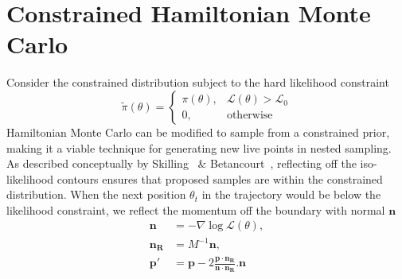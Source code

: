 \documentclass[11pt]{article}
\begin{document}
\section{Constrained Hamiltonian Monte Carlo}\label{sec:chmc}
    Consider the constrained distribution subject to the hard likelihood constraint
    \begin{equation}\label{eq:constrained_prior}
        \tilde{\pi}(\theta) = \begin{cases}
                                  \pi(\theta), & \mathcal{L}(\theta) > \mathcal{L}_0 \\
                                  0, & \text{otherwise}
                              \end{cases}
    \end{equation}
    Hamiltonian Monte Carlo can be modified to sample from a constrained prior, making it a viable
    technique for generating new live points in nested sampling.
    As described conceptually by Skilling~\cite{GMC} \& Betancourt~\cite{Betancourt_NS_CHMC}, reflecting
    off the iso-likelihood contours ensures that proposed samples are within the constrained distribution.
    When the next position $\theta_t$ in the trajectory would be below the likelihood constraint, we reflect the
    momentum off the boundary with normal $\mathbf{n}$
    \begin{equation}\label{eq:reflection}
    \begin{aligned}
        \mathbf{n} &= - \nabla \log{\mathcal{L}(\theta)}, \\
        \mathbf{n_R} &= M^{-1} \mathbf{n}, \\
        \mathbf{p'} &= \mathbf{p} - 2 \frac{ \mathbf{p} \cdot \mathbf{n_R} }{\mathbf{n} \cdot \mathbf{n_R}}. \mathbf{n}
    \end{aligned}
    \end{equation}
\end{document}
